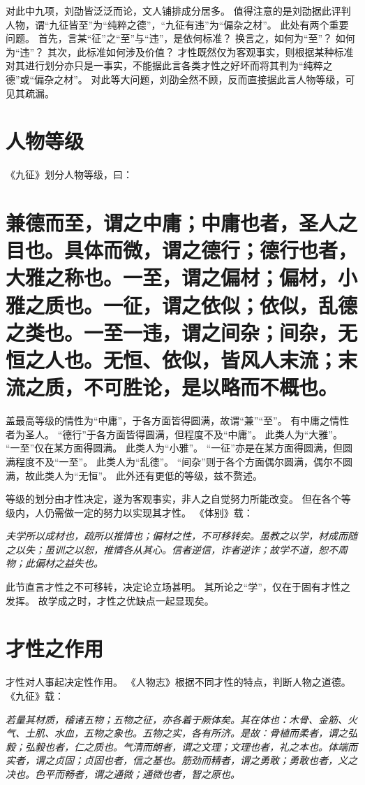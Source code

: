 \documentclass[11pt]{article}
\begin{document}
对此中九项，刘劭皆泛泛而论，文人铺排成分居多。
值得注意的是刘劭据此评判人物，谓“九征皆至”为“纯粹之德”，“九征有违”为“偏杂之材”。
此处有两个重要问题。
首先，言某“征”之“至”与“违”，是依何标准？
换言之，如何为“至”？
如何为“违”？
其次，此标准如何涉及价值？
才性既然仅为客观事实，则根据某种标准对其进行划分亦只是一事实，不能据此言各类才性之好坏而将其判为“纯粹之德”或“偏杂之材”。
对此等大问题，刘劭全然不顾，反而直接据此言人物等级，可见其疏漏。

\section{人物等级}
《九征》划分人物等级，曰：

\section{兼德而至，谓之中庸；中庸也者，圣人之目也。具体而微，谓之德行；德行也者，大雅之称也。一至，谓之偏材；偏材，小雅之质也。一征，谓之依似；依似，乱德之类也。一至一违，谓之间杂；间杂，无恒之人也。无恒、依似，皆风人末流；末流之质，不可胜论，是以略而不概也。}

盖最高等级的情性为“中庸”，于各方面皆得圆满，故谓“兼”“至”。
有中庸之情性者为圣人。
“德行”于各方面皆得圆满，但程度不及“中庸”。
此类人为“大雅”。
“一至”仅在某方面得圆满。
此类人为“小雅”。
“一征”亦是在某方面得圆满，但圆满程度不及“一至”。
此类人为“乱德”。
“间杂”则于各个方面偶尔圆满，偶尔不圆满，故此类人为“无恒”。
此外还有更低的等级，兹不赘述。

\newline

等级的划分由才性决定，遂为客观事实，非人之自觉努力所能改变。
但在各个等级内，人仍需做一定的努力以实现其才性。
《体别》载：

\textit{夫学所以成材也，疏所以推情也；偏材之性，不可移转矣。虽教之以学，材成而随之以失；虽训之以恕，推情各从其心。信者逆信，诈者逆诈；故学不道，恕不周物；此偏材之益失也。}

此节直言才性之不可移转，决定论立场甚明。
其所论之“学”，仅在于固有才性之发挥。
故学成之时，才性之优缺点一起显现矣。

\section{才性之作用}
才性对人事起决定性作用。
《人物志》根据不同才性的特点，判断人物之道德。
《九征》载：

\textit{若量其材质，稽诸五物；五物之征，亦各着于厥体矣。其在体也：木骨、金筋、火气、土肌、水血，五物之象也。五物之实，各有所济。是故：骨植而柔者，谓之弘毅；弘毅也者，仁之质也。气清而朗者，谓之文理；文理也者，礼之本也。体端而实者，谓之贞固；贞固也者，信之基也。筋劲而精者，谓之勇敢；勇敢也者，义之决也。色平而畅者，谓之通微；通微也者，智之原也。}
\end{document}
